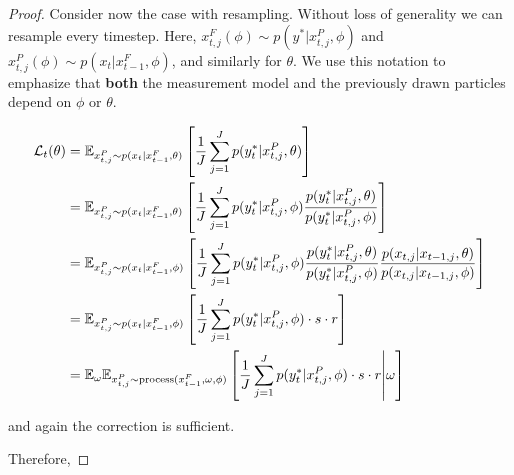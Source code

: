 \documentclass{article}
\begin{document}
\begin{proof}
    Consider now the case with resampling. Without loss of generality we can resample every timestep. Here, $x_{t,j}^F(\phi) \sim p(y^*|x_{t,j}^P, \phi)$ and $x_{t,j}^P(\phi) \sim p(x_t|x_{t-1}^F,\phi)$, and similarly for $\theta$. We use this notation to emphasize that \textbf{both} the measurement model and the previously drawn particles depend on $\phi$ or $\theta$.
    
    \begin{align*}
        \mathcal{L}_t(\theta) &= \mathbb{E}_{x_{t,j}^P \sim p(x_t|x_{t-1}^F, \theta)} \left[\frac{1}{J}\sum_{j=1}^J p(y_t^*|x_{t,j}^P,\theta) \right] \\
        &= \mathbb{E}_{x_{t,j}^P \sim p(x_t|x_{t-1}^F, \theta)} \left[\frac{1}{J}\sum_{j=1}^J p(y_t^*|x_{t,j}^P,\phi) \frac{p(y_t^*|x_{t,j}^P,\theta)}{p(y_t^*|x_{t,j}^P,\phi)} \right] \\
        &= \mathbb{E}_{x_{t,j}^P \sim p(x_t|x_{t-1}^F, \phi)} \left[\frac{1}{J}\sum_{j=1}^J p(y_t^*|x_{t,j}^P,\phi) \frac{p(y_t^*|x_{t,j}^P,\theta)}{p(y_t^*|x_{t,j}^P,\phi)} \frac{p(x_{t,j}|x_{t-1,j}, \theta) }{p(x_{t,j}|x_{t-1,j}, \phi) }\right] \\
        &= \mathbb{E}_{x_{t,j}^P \sim p(x_t|x_{t-1}^F, \phi)} \left[\frac{1}{J}\sum_{j=1}^J p(y_t^*|x_{t,j}^P,\phi) \cdot s \cdot r \right] \\
        &= \mathbb{E}_{\omega}\mathbb{E}_{x_{t,j}^P \sim \text{process}(x_{t-1}^F, \omega, \phi)} \left[\frac{1}{J}\sum_{j=1}^J p(y_t^*|x_{t,j}^P,\phi) \cdot s \cdot r \middle| \omega \right]
    \end{align*}
    
    and again the correction is sufficient.

    Therefore,


\end{proof}
\end{document}
